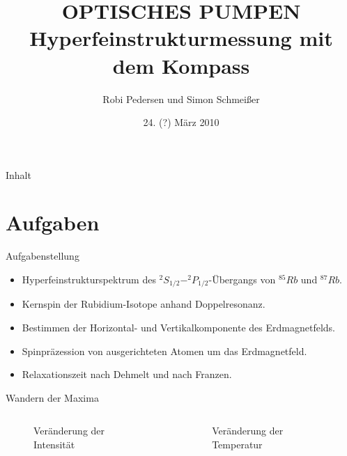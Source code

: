 \documentclass{beamer}
\title[Optisches Pumpen]{OPTISCHES PUMPEN \\ Hyperfeinstrukturmessung mit dem Kompass}
\author{Robi Pedersen und Simon Schmeißer}
\institute{Albert-Ludwig-Universität Freiburg}
\date{24. (?) März 2010}
\begin{document}
\begin{frame}
\titlepage
\end{frame}

\begin{frame}[shrink]{Inhalt}
\tableofcontents
\end{frame}


\section{Aufgaben}

\begin{frame}{Aufgabenstellung}
\begin{itemize}
\item Hyperfeinstrukturspektrum des $^2S_{1/2} - ^2P_{1/2}$-Übergangs von $^{85}Rb$ und $^{87}Rb$.
\item Kernspin der Rubidium-Isotope anhand Doppelresonanz.
\item Bestimmen der Horizontal- und Vertikalkomponente des Erdmagnetfelds. 
\item Spinpräzession von ausgerichteten Atomen um das Erdmagnetfeld.
\item Relaxationszeit nach Dehmelt und nach Franzen. 
\end{itemize}
\end{frame}


\begin{frame}{Wandern der Maxima}
\begin{columns}
\begin{column}{5cm}
	\begin{figure}[H]
	\caption{Veränderung der Intensität}
	\end{figure}
\end{column}
\begin{column}{5cm}
	\begin{figure}[H]
	\caption{Veränderung der Temperatur}
	\end{figure}
\end{column}
\end{columns}
\end{frame}
\end{document}
